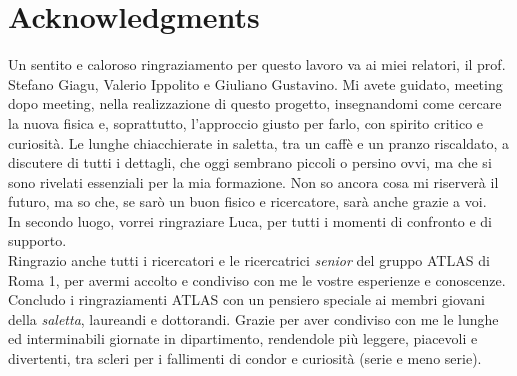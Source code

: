 \chapter*{Acknowledgments}
Un sentito e caloroso ringraziamento per questo lavoro va ai miei relatori, il prof. Stefano Giagu, Valerio Ippolito e Giuliano Gustavino.
Mi avete guidato, meeting dopo meeting, nella realizzazione di questo progetto, insegnandomi come cercare la nuova fisica e, soprattutto, l'approccio giusto per farlo, con spirito critico e curiosità.
Le lunghe chiacchierate in saletta, tra un caffè e un pranzo riscaldato, a discutere di tutti i dettagli, che oggi sembrano piccoli o persino ovvi, ma che si sono rivelati essenziali per la mia formazione.
Non so ancora cosa mi riserverà il futuro, ma so che, se sarò un buon fisico e ricercatore, sarà anche grazie a voi.\\
In secondo luogo, vorrei ringraziare Luca, per tutti i momenti di confronto e di supporto.\\ 
Ringrazio anche tutti i ricercatori e le ricercatrici \textit{senior} del gruppo ATLAS di Roma 1, per avermi accolto e condiviso con me le vostre esperienze e conoscenze.\\
Concludo i ringraziamenti ATLAS con un pensiero speciale ai membri giovani della \textit{saletta}, laureandi e dottorandi. 
Grazie per aver condiviso con me le lunghe ed interminabili giornate in dipartimento, rendendole più leggere, piacevoli e divertenti, tra scleri per i fallimenti di condor e curiosità (serie e meno serie).\\\\

